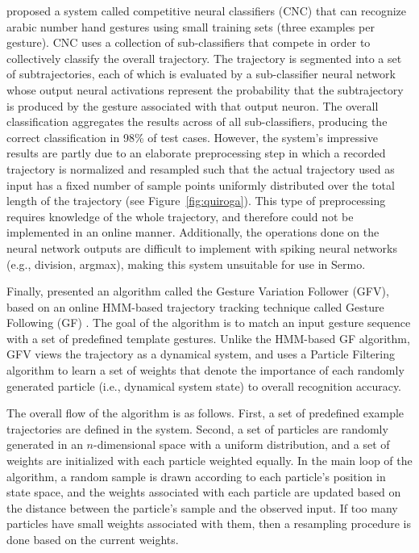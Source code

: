 \cite{quiroga2013}
proposed a system called competitive neural classifiers (CNC)
that can recognize arabic number hand gestures
using small training sets (three examples per gesture).
CNC uses a collection of sub-classifiers
that compete in order to collectively
classify the overall trajectory.
The trajectory is segmented
into a set of subtrajectories,
each of which is evaluated by
a sub-classifier neural network
whose output neural activations
represent the probability that
the subtrajectory is produced by
the gesture associated with that output neuron.
The overall classification aggregates the results
across of all sub-classifiers,
producing the correct classification
in 98\% of test cases.
However, the system's impressive results
are partly due to an elaborate preprocessing step
in which a recorded trajectory
is normalized and resampled
such that the actual trajectory used as input
has a fixed number of sample points
uniformly distributed over
the total length of the trajectory
(see Figure~\ref{fig:quiroga}).
This type of preprocessing
requires knowledge of the whole trajectory,
and therefore could not be implemented
in an online manner.
Additionally, the operations done
on the neural network outputs
are difficult to implement
with spiking neural networks
(e.g., division, argmax),
making this system unsuitable
for use in Sermo.


Finally, \cite{caramiaux2014}
presented an algorithm called the
Gesture Variation Follower (GFV),
based on an online HMM-based
trajectory tracking technique
called Gesture Following (GF)
\cite{bevilacqua2010,bevilacqua2011}.
The goal of the algorithm is to match
an input gesture sequence
with a set of predefined template gestures.
Unlike the HMM-based GF algorithm,
GFV views the trajectory as a dynamical system,
and uses a Particle Filtering algorithm
to learn a set of weights
that denote the importance of
each randomly generated particle
(i.e., dynamical system state)
to overall recognition accuracy.

The overall flow of the algorithm
is as follows.
First, a set of predefined example trajectories
are defined in the system.
Second, a set of particles
are randomly generated
in an $n$-dimensional space
with a uniform distribution,
and a set of weights are initialized
with each particle weighted equally.
In the main loop of the algorithm,
a random sample is drawn
according to each particle's position
in state space,
and the weights associated with each particle
are updated based on the distance
between the particle's sample
and the observed input.
If too many particles have small weights
associated with them,
then a resampling procedure is done
based on the current weights.


